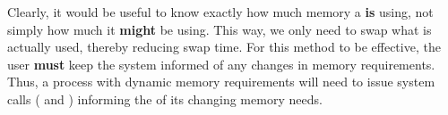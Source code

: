 Clearly, it would be useful to know exactly how much memory a   \textbf{is} using, not simply how much it \textbf{might} be using.
This way, we only need to swap what is actually used, thereby reducing swap time.
For this method to be effective, the user \textbf{must} keep the system informed of any changes in memory requirements.
Thus, a process with dynamic memory requirements will need to issue system calls ( and ) informing the  of its changing memory needs.



